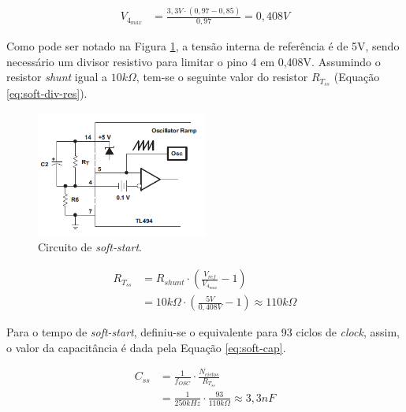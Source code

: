 \documentclass[a4paper]{article}
\begin{document}
{\begin{equation}
\label{eq:deadv}
\begin{split}
V_{4_{max}} & = \frac{3,3V \cdot \left(0,97-0,85\right)}{0,97} = 0,408V
\end{split}
\end{equation}

Como pode ser notado na Figura \ref{fig:soft-div}, a tensão interna de referência é de 5V, sendo necessário um divisor resistivo para limitar o pino 4 em 0,408V. Assumindo o resistor \emph{shunt} igual a $10k\Omega$, tem-se o seguinte valor do resistor $R_{T_{ss}}$ (Equação \ref{eq:soft-div-res}).

\begin{figure}[H]
	\centering
	\includegraphics[width=0.5\textwidth]{soft-div.png}
	\caption{Circuito de \emph{soft-start}.}
	\label{fig:soft-div}
\end{figure}

\begin{equation}
\label{eq:soft-div-res}
\begin{split}
R_{T_{ss}} & = R_{shunt} \cdot \left( \frac{V_{ref}}{V_{4_{max}}} - 1\right) \\
& = 10k\Omega \cdot \left( \frac{5V}{0,408V} - 1\right) \approx 110k\Omega
\end{split}
\end{equation}

Para o tempo de \emph{soft-start}, definiu-se o equivalente para 93 ciclos de \emph{clock}, assim, o valor da capacitância é dada pela Equação \ref{eq:soft-cap}.

\begin{equation}
\label{eq:soft-cap}
\begin{split}
C_{ss} & =  \frac{1}{f_{OSC}} \cdot \frac{N_{ciclos}}{R_{T_{ss}}}\\
& = \frac{1}{250kHz} \cdot \frac{93}{110k\Omega} \approx 3,3nF
\end{split}
\end{equation}

}
\end{document}
